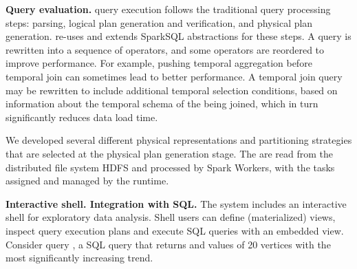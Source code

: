 
{\bf Query evaluation.}  \ql query execution follows the traditional
query processing steps: parsing, logical plan generation and
verification, and physical plan generation.  \ql re-uses and extends
SparkSQL abstractions for these steps.  A \ql query is rewritten into
a sequence of operators, and some operators are reordered to improve
performance.  For example, pushing temporal aggregation before
temporal join can sometimes lead to better performance.  A temporal
join query may be rewritten to include additional temporal selection
conditions, based on information about the temporal schema of the \tgs
being joined, which in turn significantly reduces data load time.

We developed several different physical representations and
partitioning strategies that are selected at the physical plan
generation stage.  The \tgs are read from the distributed file system
HDFS and processed by Spark Workers, with the tasks assigned and
managed by the runtime.

{\bf Interactive shell.  Integration with SQL.} The \ql system
includes an interactive shell for exploratory data analysis.  Shell
users can define (materialized) \tg views, inspect query execution
plans and execute SQL queries with an embedded \ql view.  Consider
query , a SQL query that returns  and 
values of 20 vertices with the most significantly increasing
 trend.


